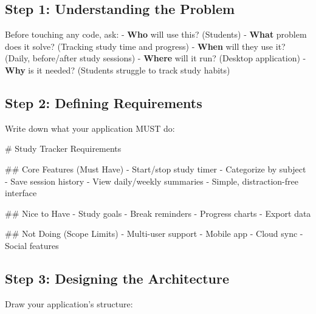 \documentclass[
  letterpaper,
  DIV=11,
  numbers=noendperiod,
  oneside]{scrreprt}
\newenvironment{Shaded}{}{}
\newcommand{\FunctionTok}[1]{\textcolor[rgb]{0.44,0.26,0.76}{#1}}
\newcommand{\NormalTok}[1]{\textcolor[rgb]{0.14,0.16,0.18}{#1}}
\newcommand{\SpecialStringTok}[1]{\textcolor[rgb]{0.01,0.18,0.38}{#1}}
\begin{document}
\subsection{Step 1: Understanding the
Problem}\label{step-1-understanding-the-problem}

Before touching any code, ask: - \textbf{Who} will use this? (Students)
- \textbf{What} problem does it solve? (Tracking study time and
progress) - \textbf{When} will they use it? (Daily, before/after study
sessions) - \textbf{Where} will it run? (Desktop application) -
\textbf{Why} is it needed? (Students struggle to track study habits)

\subsection{Step 2: Defining
Requirements}\label{step-2-defining-requirements}

Write down what your application MUST do:

\begin{Shaded}
\begin{Highlighting}[]
\FunctionTok{\# Study Tracker Requirements}

\FunctionTok{\#\# Core Features (Must Have)}
\SpecialStringTok{{-} }\NormalTok{Start/stop study timer}
\SpecialStringTok{{-} }\NormalTok{Categorize by subject}
\SpecialStringTok{{-} }\NormalTok{Save session history}
\SpecialStringTok{{-} }\NormalTok{View daily/weekly summaries}
\SpecialStringTok{{-} }\NormalTok{Simple, distraction{-}free interface}

\FunctionTok{\#\# Nice to Have}
\SpecialStringTok{{-} }\NormalTok{Study goals}
\SpecialStringTok{{-} }\NormalTok{Break reminders}
\SpecialStringTok{{-} }\NormalTok{Progress charts}
\SpecialStringTok{{-} }\NormalTok{Export data}

\FunctionTok{\#\# Not Doing (Scope Limits)}
\SpecialStringTok{{-} }\NormalTok{Multi{-}user support}
\SpecialStringTok{{-} }\NormalTok{Mobile app}
\SpecialStringTok{{-} }\NormalTok{Cloud sync}
\SpecialStringTok{{-} }\NormalTok{Social features}
\end{Highlighting}
\end{Shaded}

\subsection{Step 3: Designing the
Architecture}\label{step-3-designing-the-architecture}

Draw your application's structure:
\end{document}

